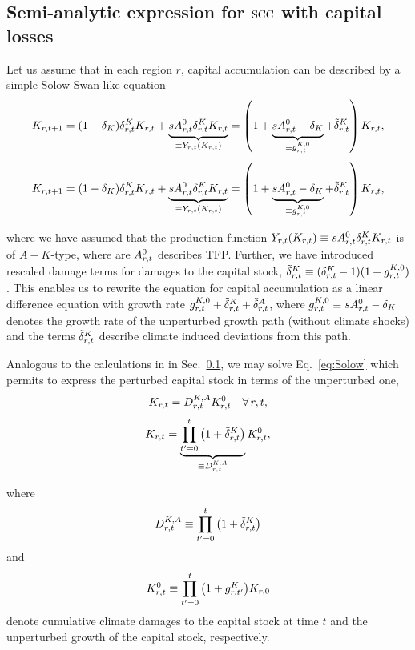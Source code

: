\documentclass[preprint,3p,authoryear]{elsarticle}
\begin{document}
\subsection{Semi-analytic expression for $\operatorname{SCC}$ with capital losses}
\label{subsec:analytSCC}
Let us assume that in each region $r$, capital accumulation can be described by a simple Solow-Swan like equation
  \begin{equation}
  \label{eq:Solow}
    K_{r,t+1} = (1-\delta_K)\delta^K_{r,t}K_{r,t}+\underbrace{sA^{0}_{r,t}\delta^K_{r,t}K_{r,t}}_{\equiv Y_{r,t}(K_{r,t})}
    = \left(1+\underbrace{sA^{0}_{r,t}-\delta_K}_{\equiv g^{K,0}_{r,t}} +\tilde{\delta}^K_{r,t}\right)K_{r,t},
  \end{equation}
\begin{equation}
    K_{r,t+1} = (1-\delta_K)\delta^K_{r,t}K_{r,t}+\underbrace{sA^{0}_{r,t}\delta^K_{r,t}K_{r,t}}_{\equiv Y_{r,t}(K_{r,t})}
    = \left(1+\underbrace{sA^{0}_{r,t}-\delta_K}_{\equiv g^{K,0}_{r,t}} +\tilde{\delta}^K_{r,t}\right)K_{r,t},
  \end{equation}

  where we have assumed that the production function $Y_{r,t}(K_{r,t})\equiv s A^{0}_{r,t}\delta^K_{r,t}K_{r,t}$ is of $A-K$-type, where are $A^{0}_{r,t}$ describes TFP. Further, we have introduced  rescaled damage terms for damages to the capital stock, $\tilde{\delta}^K_{r,t}\equiv(\delta^K_{r,t}-1)(1+g^{K,0}_{r,t})$. This enables us to rewrite the equation for capital accumulation as a linear difference equation with growth rate  $g^{K,0}_{r,t}+\tilde{\delta}^K_{r,t}+\tilde{\delta}^A_{r,t}$, where $g^{K,0}_{r,t}\equiv sA^{0}_{r,t}-\delta_K $ denotes the growth rate of the unperturbed growth path (without climate shocks) and the terms $\tilde{\delta}^K_{r,t}$ describe climate induced deviations from this path.

Analogous to the calculations in in Sec.~\ref{subsec:analytSCC}, we may solve Eq.~\eqref{eq:Solow} which permits to express the perturbed capital stock in terms of the unperturbed one,
\begin{equation}
  \label{eq:Solow2}
  K_{r,t}=D^{K,A}_{r,t}K^0_{r,t}\quad\forall\,r,t,
\end{equation}
\begin{equation*} K_{r,t}=\underbrace{\prod_{t'=0}^{t}\left(1+\tilde{\delta}^K_{r,t}\right)}_{\equiv D^{K,A}_{r,t}}K^0_{r,t},
\end{equation*}

where
\begin{equation}
  \label{eq:D}
  D^{K,A}_{r,t}\equiv\prod_{t'=0}^{t}\left(1+\tilde{\delta}^K_{r,t}\right)
\end{equation}
and
\begin{equation}
  \label{eq:YNull}
 K^0_{r,t}\equiv\prod_{t'=0}^{t} \big(1+g^{K}_{r,t'}\big)K_{r,0} 
\end{equation}
 denote cumulative climate damages to the capital stock at time $t$ and the unperturbed growth of the capital stock, respectively.
\end{document}
